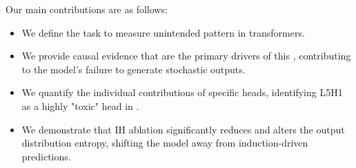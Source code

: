 Our main contributions are as follows:
\begin{itemize}[leftmargin=*,itemsep=0pt,topsep=0pt]
    \item We define the \taskname task to measure unintended pattern \leakage in transformers.
    \item We provide causal evidence that \inductionheads are the primary drivers of this \leakage, contributing to the model's failure to generate stochastic outputs.
    \item We quantify the individual contributions of specific heads, identifying L5H1 as a highly "toxic" head in \gpttwo.
    \item We demonstrate that IH ablation significantly reduces \leakage and alters the output distribution entropy, shifting the model away from induction-driven predictions.
\end{itemize}
